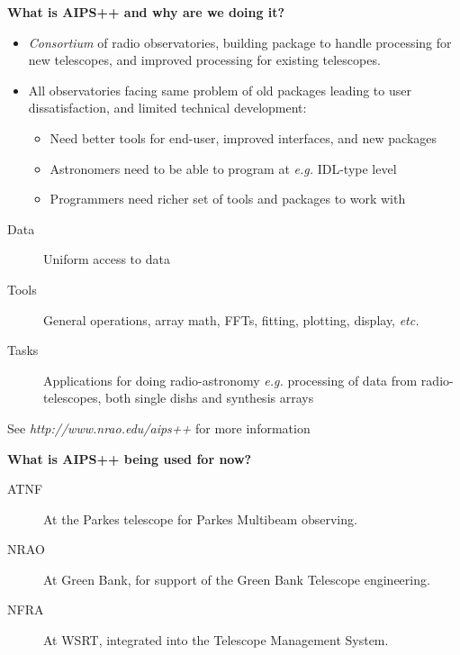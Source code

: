 %



\newenvironment{slide}[1]{\LARGE\begin{center}{\bf #1}\end{center}}{\newpage}
\newenvironment{figlab}[1]{\Large\begin{center}{\bf #1}\end{center}}{\newpage}

\begin{slide}{What is AIPS++ and why are we doing it?}
\begin{itemize}
\item {\em Consortium} of radio observatories, building package
to handle processing for new telescopes, and improved processing
for existing telescopes.
\item All observatories facing same problem of old packages
leading to user dissatisfaction, and limited technical
development:
\begin{itemize}
\item Need better tools for end-user, improved interfaces,
and new packages
\item Astronomers need to be able to program at {\em e.g.}
IDL-type level
\item Programmers need richer set of tools and packages to
work with
\end{itemize}
\end{itemize}
\begin{description}
\item[Data] Uniform access to data
\item[Tools] General operations, array math, FFTs, fitting, plotting,
display, {\em etc.}
\item[Tasks] Applications for doing radio-astronomy {\em e.g.}
processing of data from radio-telescopes, both single dishs and
synthesis arrays
\end{description}
See {\em http://www.nrao.edu/aips++} for more information
\end{slide}

\begin{slide}{What is AIPS++ being used for now?}
\begin{description}
\item[ATNF] At the Parkes telescope for Parkes Multibeam 
observing.
\item[NRAO] At Green Bank, for support of the Green Bank
Telescope engineering.
\item[NFRA] At WSRT, integrated into the Telescope Management
System.
\end{description}
\end{slide}

